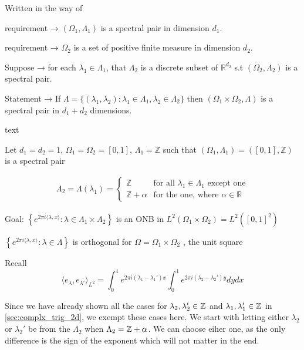 \documentclass[../thesis.tex]{subfiles}
\begin{document}
Written in the way of \cite{jorgensenSpectralPairsCartesian2001}

\begin{theorem}
    requirement → $(\Omega_1,\Lambda_1)$ is a spectral pair in dimension $d_1$.

    requirement →  $\Omega_2$ is a set of positive finite measure in dimension $d_2$.

    Suppose →  for each $\lambda_1 \in \Lambda_1$, that $\Lambda_2$ is a discrete subset of $\mathbb{R}^{d_2}$ s.t $(\Omega_2,\Lambda_2)$ is a spectral pair.

    Statement → If $\Lambda=\{(\lambda_1,\lambda_2): \lambda_1\in \Lambda_1, \lambda_2 \in \Lambda_2\}$ then $(\Omega_1\times\Omega_2, \Lambda)$ is a spectral pair in $d_1+d_2$ dimensions. 
\end{theorem}



\begin{example}
    text\\
\end{example}


Let $d_1=d_2=1$,  $\Omega_1 = \Omega_2=[0,1]$, $\Lambda_1 = \mathbb{Z}$ such that $(\Omega_1,\Lambda_1)=([0,1],\mathbb{Z})$ is a spectral pair


\begin{align*}
    \Lambda_2=\Lambda(\lambda_1) = \begin{cases}        
        \mathbb{Z} & \text{for all } \lambda_1 \in \Lambda_1 \text{ except one}\\        
        \mathbb{Z}+\alpha & \text{for the one, where } \alpha \in \mathbb{R}   
    \end{cases}
\end{align*}


Goal: $\left\{ e^{2\pi i \langle \lambda,x  \rangle } : \lambda \in \Lambda_1\times\Lambda_2\right\}$ is an ONB in $L^2(\Omega_1\times\Omega_2)= L^2{([0,1]^2)}$


$\left\{ e^{2\pi i \langle \lambda,x  \rangle } : \lambda \in \Lambda\right\}$ is orthogonal for $\Omega = \Omega_1 \times \Omega_2$ , the unit square

Recall 
\begin{equation*}
    \langle e_\lambda,e_{\lambda'} \rangle_{L^2} = \int_0^1e^{2\pi i  (\lambda_1- \lambda_1')x}\int_0^1  e^{2\pi i  (\lambda_2 - \lambda_2')y} dy dx
\end{equation*}

Since we have already shown all the cases for $\lambda_2,\lambda_2' \in \mathbb{Z}$ and $\lambda_1,\lambda_1' \in \mathbb{Z}$ in \cref{sec:complx_trig_2d}, we exempt these cases here. We start with letting either $\lambda_2$ or $\lambda_2'$ be from the $\Lambda_2$ when $\Lambda_2=\mathbb{Z}+\alpha$. We can choose eiher one, as the only difference is the sign of the exponent which will not matter in the end.
\end{document}
